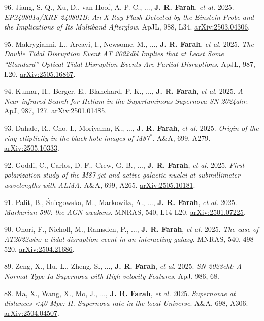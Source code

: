 \documentclass[margin,line]{res}
\newcommand{\apj}{ApJ}                    %
\newcommand{\apjl}{ApJL}                  %
\newcommand{\aap}{A\&A}                   %
\newcommand{\mnras}{MNRAS}                %
\begin{document}
\begin{resume}
96. Jiang, S.-Q., Xu, D., van Hoof, A. P. C., ..., \textbf{J. R. Farah}, \textit{et al.} 2025. \textit{EP240801a/XRF 240801B: An X-Ray Flash Detected by the Einstein Probe and the Implications of Its Multiband Afterglow}. \apjl, 988, L34. \href{https://arxiv.org/abs/2503.04306}{arXiv:2503.04306}.

95. Makrygianni, L., Arcavi, I., Newsome, M., ..., \textbf{J. R. Farah}, \textit{et al.} 2025. \textit{The Double Tidal Disruption Event AT 2022dbl Implies that at Least Some ``Standard'' Optical Tidal Disruption Events Are Partial Disruptions}. \apjl, 987, L20. \href{https://arxiv.org/abs/2505.16867}{arXiv:2505.16867}.

94. Kumar, H., Berger, E., Blanchard, P. K., ..., \textbf{J. R. Farah}, \textit{et al.} 2025. \textit{A Near-infrared Search for Helium in the Superluminous Supernova SN 2024ahr}. \apj, 987, 127. \href{https://arxiv.org/abs/2501.01485}{arXiv:2501.01485}.

93. Dahale, R., Cho, I., Moriyama, K., ..., \textbf{J. R. Farah}, \textit{et al.} 2025. \textit{Origin of the ring ellipticity in the black hole images of M87$^{*}$}. \aap, 699, A279. \href{https://arxiv.org/abs/2505.10333}{arXiv:2505.10333}.

92. Goddi, C., Carlos, D. F., Crew, G. B., ..., \textbf{J. R. Farah}, \textit{et al.} 2025. \textit{First polarization study of the M87 jet and active galactic nuclei at submillimeter wavelengths with ALMA}. \aap, 699, A265. \href{https://arxiv.org/abs/2505.10181}{arXiv:2505.10181}.

91. Palit, B., {\'S}niegowska, M., Markowitz, A., ..., \textbf{J. R. Farah}, \textit{et al.} 2025. \textit{Markarian 590: the AGN awakens}. \mnras, 540, L14-L20. \href{https://arxiv.org/abs/2501.07225}{arXiv:2501.07225}.

90. Onori, F., Nicholl, M., Ramsden, P., ..., \textbf{J. R. Farah}, \textit{et al.} 2025. \textit{The case of AT2022wtn: a tidal disruption event in an interacting galaxy}. \mnras, 540, 498-520. \href{https://arxiv.org/abs/2504.21686}{arXiv:2504.21686}.

89. Zeng, X., Hu, L., Zheng, S., ..., \textbf{J. R. Farah}, \textit{et al.} 2025. \textit{SN 2023ehl: A Normal Type Ia Supernova with High-velocity Features}. \apj, 986, 68.

88. Ma, X., Wang, X., Mo, J., ..., \textbf{J. R. Farah}, \textit{et al.} 2025. \textit{Supernovae at distances <40 Mpc: II. Supernova rate in the local Universe}. \aap, 698, A306. \href{https://arxiv.org/abs/2504.04507}{arXiv:2504.04507}.


\end{resume}
\end{document}
